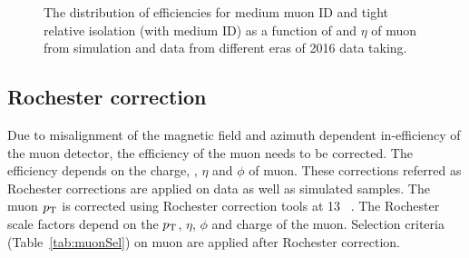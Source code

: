 \begin{figure}
    \caption{ The distribution of efficiencies for medium muon ID and tight relative
    isolation (with medium ID) as a function of \pt and $\eta$ of muon from simulation 
    and data from different eras of 2016 data taking.}
    \label{fig:muonIsoIDEff}
\end{figure}

\subsection{Rochester correction}
Due to misalignment of the magnetic field and azimuth dependent in-efficiency of 
the muon detector, the efficiency of the muon needs to be corrected. The efficiency
depends on the charge, \pt, $\eta$ and $\phi$ of muon. These corrections referred as 
Rochester corrections are applied on data as well as simulated samples. The muon $p_{\mathrm{T}}$ is
corrected using Rochester correction tools at 13 \TeV~\cite{Bodek:2012id}.
The Rochester scale factors depend on the $p_{\mathrm{T}}$, $\eta$, $\phi$ and charge of the 
muon. Selection criteria (Table~\ref{tab:muonSel}) on muon are applied after 
Rochester correction.

